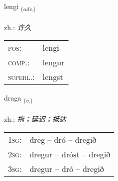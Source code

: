 \documentclass[frontgrid, backgrid]{flacards}\usepackage[]{graphicx}\usepackage[]{xcolor}
\begin{document}
{lengi \small{\textsubscript{(\textit{adv.})}} \\[1ex] %
\textphonetic{[leiɲcɪ]} \\
zh.: \emph{许久} \\  [2ex]
\renewcommand*{\arraystretch}{0.8}
\begin{tabular}{ll}
\textsc{pos}: & lengi \\ 
\textsc{comp.}: & lengur \\ 
\textsc{superl.}: & lengst \\
\end{tabular}
}

\renewcommand{\flhead}{\vskip5pt \fboxsep=0pt {\small\bfseries\footnotesize Sagnorð | 动词}}
\renewcommand{\fcfoot}{\vskip5pt \fboxsep=0pt \hspace{2pt}{\small\bfseries\footnotesize 1K}}

\renewcommand{\blhead}{\vskip5pt {\small\bfseries\footnotesize Sagnorð | 动词 }}
\renewcommand{\bcfoot}{\vskip5pt \hspace{2pt}{\small\bfseries\footnotesize 1K}}


{draga \small{\textsubscript{(\textit{v.})}} \\[1ex] %
\textphonetic{[traːɣa]} \\
zh.: \emph{拖；延迟；抵达} \\  [2ex]
\renewcommand*{\arraystretch}{0.8}
\begin{tabular}{p{1cm}l}
\textsc{1sg}: & dreg -- dró -- dregið \\ 
\textsc{2sg}: & dregur -- dróst -- dregið \\ 
\textsc{3sg}: & dregur -- dró -- dregið \\ 
\end{tabular}
}

\renewcommand{\flhead}{\vskip5pt \fboxsep=0pt {\small\bfseries\footnotesize Nafnorð | 名词}}
\renewcommand{\fcfoot}{\vskip5pt \fboxsep=0pt \hspace{2pt}{\small\bfseries\footnotesize 1K}}
\end{document}
